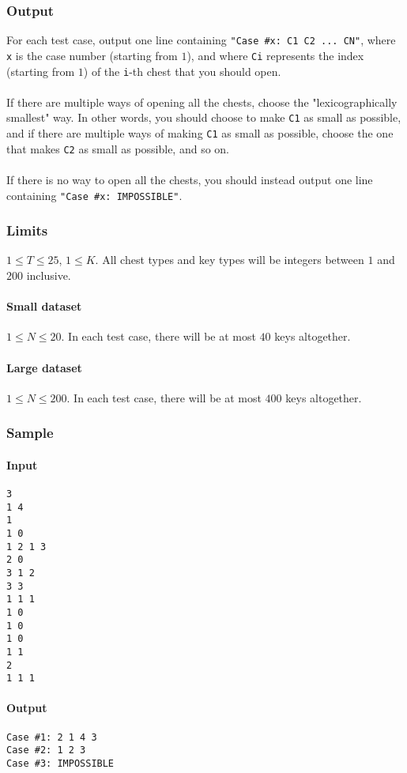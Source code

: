 \documentclass[titlepage]{article}
\begin{document}
\subsubsection{Output}
For each test case, output one line containing \verb+"Case #x: C1 C2 ... CN"+, where \verb+x+ is the case number (starting from $1$), and where \verb+Ci+ represents the index (starting from $1$) of the \verb+i+-th chest that you should open.
\paragraph{}
If there are multiple ways of opening all the chests, choose the "lexicographically smallest" way. In other words, you should choose to make \verb+C1+ as small as possible, and if there are multiple ways of making \verb+C1+ as small as possible, choose the one that makes \verb+C2+ as small as possible, and so on.
\paragraph{}
If there is no way to open all the chests, you should instead output one line containing \verb+"Case #x: IMPOSSIBLE"+.

\subsubsection{Limits}
$1\leq T\leq25$, $1\leq K$. All chest types and key types will be integers between $1$ and $200$ inclusive.

\paragraph{Small dataset}
$1\leq N\leq20$. In each test case, there will be at most $40$ keys altogether.

\paragraph{Large dataset}
$1\leq N\leq200$. In each test case, there will be at most $400$ keys altogether.

\subsubsection{Sample}
\paragraph{Input}
\begin{verbatim}
3
1 4
1
1 0
1 2 1 3
2 0
3 1 2
3 3
1 1 1
1 0
1 0
1 0
1 1
2
1 1 1
\end{verbatim}
\paragraph{Output}
\begin{verbatim}
Case #1: 2 1 4 3
Case #2: 1 2 3
Case #3: IMPOSSIBLE
\end{verbatim}
\end{document}
